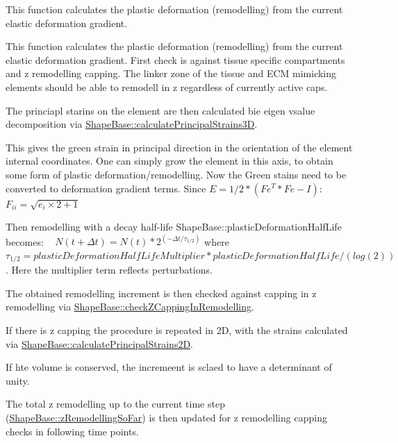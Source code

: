 This function calculates the plastic deformation (remodelling) from the current elastic deformation gradient. 

This function calculates the plastic deformation (remodelling) from the current elastic deformation gradient. First check is against tissue specific compartments and z remodelling capping. The linker zone of the tissue and E\+C\+M mimicking elements should be able to remodell in z regardless of currently active caps.

The princiapl starins on the element are then calculated bie eigen vsalue decomposition via \hyperlink{classShapeBase_a3cde54fe712bac297fa73949d07c1bd4}{Shape\+Base\+::calculate\+Principal\+Strains3\+D}.

This gives the green strain in principal direction in the orientation of the element internal coordinates. One can simply grow the element in this axis, to obtain some form of plastic deformation/remodelling. Now the Green stains need to be converted to deformation gradient terms. Since $ E = 1/2 *(Fe^T*Fe-I): $ $ F_{ii} = \sqrt{e_{i} \times 2 + 1} $

Then remodelling with a decay half-\/life Shape\+Base\+::plastic\+Deformation\+Half\+Life becomes\+: ~\newline
 $ N(t+\Delta t) = N(t) * 2 ^ (-\Delta t/\tau_{1/2}) $ where $ \tau_{1/2} = plasticDeformationHalfLifeMultiplier * plasticDeformationHalfLife/(log(2)) $. Here the multiplier term reflects perturbations.

The obtained remodelling increment is then checked against capping in z remodelling via \hyperlink{classShapeBase_a2e7fdc8e749b8b709b6c80248dc2bc3f}{Shape\+Base\+::check\+Z\+Capping\+In\+Remodelling}.

If there is z capping the procedure is repeated in 2\+D, with the strains calculated via \hyperlink{classShapeBase_a6fe833f9684db5cc1847761b6bbd9aa9}{Shape\+Base\+::calculate\+Principal\+Strains2\+D}.

If hte volume is conserved, the incremeent is sclaed to have a determinant of unity.

The total z remodelling up to the current time step (\hyperlink{classShapeBase_a0dc566eb70e64da9fc3fa222b16999da}{Shape\+Base\+::z\+Remodelling\+So\+Far}) is then updated for z remodelling capping checks in following time points.\hypertarget{classShapeBase_afbbf191777e8787a0e8307d30ce0aa9d}{}
